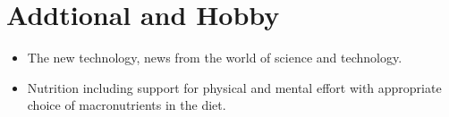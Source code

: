 \documentclass[1pt]{my_cv}
\begin{document}
	\section*{Addtional and Hobby}	
		\begin{itemize} \itemsep 0pt \parskip 0pt \parsep 0pt 			
		\item The new technology, news from the world of science and technology.
		\item Nutrition including support for physical and mental effort with appropriate choice of macronutrients in the diet. 
		\end{itemize}

	
\end{document}
